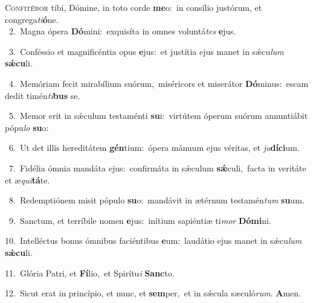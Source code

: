 \lettrine{\initial\textcolor{\initialcolor}{C}}{onfitébor} tibi, Dómine, in toto corde \textbf{me}\-o:~\star in consílio justórum, et congrega\-\textit{ti}\-\textbf{ó}ne.\\
{\numbfont\textcolor{\numbcolor}{~2.}}~Magna ópera \textbf{Dó}\-mini:~\star exquisíta in omnes voluntá\textit{tes} \textbf{e}\-jus.\par
{\numbfont\textcolor{\numbcolor}{~3.}}~Conféssio et magnificéntia opus \textbf{e}\-jus:~\star et justítia ejus manet in sǽcu\textit{lum} \textbf{sǽ}\-\textbf{cu}li.\par
{\numbfont\textcolor{\numbcolor}{~4.}}~Memóriam fecit mirabílium suórum,~\dagger miséricors et miserátor \textbf{Dó}\-minus:~\star escam dedit timén\-\textit{ti}\-\textbf{bus} se.\par
{\numbfont\textcolor{\numbcolor}{~5.}}~Memor erit in sǽculum testaménti \textbf{su}\-i:~\star virtútem óperum suórum annuntiábit pópu\textit{lo} \textbf{su}\-o:\par
{\numbfont\textcolor{\numbcolor}{~6.}}~Ut det illis hereditátem \textbf{gén}\-tium:~\star ópera mánuum ejus véritas, et \textit{ju}\-\textbf{dí}\textbf{ci}um.\par
{\numbfont\textcolor{\numbcolor}{~7.}}~Fidélia ómnia mandáta ejus:~\dagger confirmáta in sǽculum \textbf{sǽ}\-culi,~\star facta in veritáte et æ\-\textit{qui}\-\textbf{tá}te.\par
{\numbfont\textcolor{\numbcolor}{~8.}}~Redemptiónem misit pópulo \textbf{su}\-o:~\star mandávit in ætérnum testamén\textit{tum} \textbf{su}\-um.\par
{\numbfont\textcolor{\numbcolor}{~9.}}~Sanctum, et terríbile nomen \textbf{e}\-jus:~\star inítium sapiéntiæ ti\textit{mor} \textbf{Dó}\-\textbf{mi}ni.\par
{\numbfont\textcolor{\numbcolor}{10.}}~Intelléctus bonus ómnibus faciéntibus \textbf{e}\-um:~\star laudátio ejus manet in sǽcu\textit{lum} \textbf{sǽ}\-\textbf{cu}li.\par
{\numbfont\textcolor{\numbcolor}{11.}}~Glória Patri, et \textbf{Fí}\-lio,~\star et Spirítu\textit{i} \textbf{Sanc}\-to.\par
{\numbfont\textcolor{\numbcolor}{12.}}~Sicut erat in princípio, et nunc, et \textbf{sem}\-per,~\star et in sǽcula sæculó\-\textit{rum}\-. \textbf{A}\-men.\par
